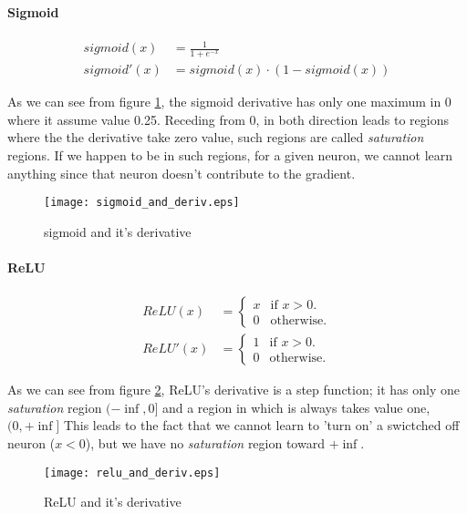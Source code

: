 

\paragraph{Sigmoid}

\begin{align}
sigmoid(x)&= \frac{1}{1+e^{-x}}  \\ 
sigmoid'(x)&= sigmoid(x) \cdot (1-sigmoid(x))
\end{align}

As we can see from figure \ref{sigmoid_plot}, the sigmoid derivative has only one maximum in 0 where it assume value 0.25. Receding from 0, in both direction leads to regions where
the the derivative take zero value, such regions are called \textit{saturation} regions. If we happen to be in such regions, for a given neuron, we cannot learn anything since that neuron doesn't contribute
to the gradient.

\begin{figure}[h]
  \centering
    \texttt{[image: sigmoid\_and\_deriv.eps]}
  \caption{sigmoid and it's derivative}
\label{sigmoid_plot}
\end{figure}



\paragraph{ReLU}


\begin{align}
  ReLU(x)&=\begin{cases}
    x & \text{if $x>0$}.\\
    0 & \text{otherwise}.
  \end{cases} \\ 
   ReLU'(x)&=\begin{cases}
    1 & \text{if $x>0$}.\\
    0 & \text{otherwise}.
  \end{cases}
\end{align}


As we can see from figure \ref{relu_plot}, ReLU's derivative is a step function; it has only one \textit{saturation} region $(-\inf, 0]$ and a region in which is always takes value one, $(0,+\inf]$
This leads to the fact that we cannot learn to 'turn on' a swictched off neuron ($x<0$), but we have no \textit{saturation} region toward $+\inf$.

\begin{figure}[h]
  \centering
    \texttt{[image: relu\_and\_deriv.eps]}
  \caption{ReLU and it's derivative}
\label{relu_plot}
\end{figure}
